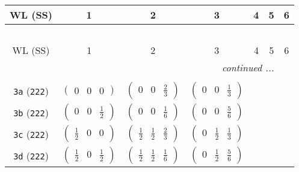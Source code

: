 \documentclass[fleqn,9pt,landscape]{jsarticle}
\begin{document}
\begin{center}
\renewcommand{\arraystretch}{1.2}
\begin{longtable}{ccccccc}
 \hline \hline
WL (SS) & 1 & 2 & 3 & 4 & 5 & 6 \\ \hline \endfirsthead

\multicolumn{6}{l}{\tablename\ \thetable{}} \\
 \hline \hline
WL (SS) & 1 & 2 & 3 & 4 & 5 & 6 \\ \hline \endhead

 \hline \hline
\multicolumn{6}{r}{\footnotesize\it continued ...} \\ \endfoot

 \hline \hline
\multicolumn{6}{r}{} \\ \endlastfoot

{\tt 3a} ({\tt 222}) & $ \begin{pmatrix} 0 & 0 & 0 \end{pmatrix} $ & $ \begin{pmatrix} 0 & 0 & \frac{2}{3} \end{pmatrix} $ & $ \begin{pmatrix} 0 & 0 & \frac{1}{3} \end{pmatrix} $ & $  $ & $  $ & $  $ \\ \hline
{\tt 3b} ({\tt 222}) & $ \begin{pmatrix} 0 & 0 & \frac{1}{2} \end{pmatrix} $ & $ \begin{pmatrix} 0 & 0 & \frac{1}{6} \end{pmatrix} $ & $ \begin{pmatrix} 0 & 0 & \frac{5}{6} \end{pmatrix} $ & $  $ & $  $ & $  $ \\ \hline
{\tt 3c} ({\tt 222}) & $ \begin{pmatrix} \frac{1}{2} & 0 & 0 \end{pmatrix} $ & $ \begin{pmatrix} \frac{1}{2} & \frac{1}{2} & \frac{2}{3} \end{pmatrix} $ & $ \begin{pmatrix} 0 & \frac{1}{2} & \frac{1}{3} \end{pmatrix} $ & $  $ & $  $ & $  $ \\ \hline
{\tt 3d} ({\tt 222}) & $ \begin{pmatrix} \frac{1}{2} & 0 & \frac{1}{2} \end{pmatrix} $ & $ \begin{pmatrix} \frac{1}{2} & \frac{1}{2} & \frac{1}{6} \end{pmatrix} $ & $ \begin{pmatrix} 0 & \frac{1}{2} & \frac{5}{6} \end{pmatrix} $ & $  $ & $  $ & $  $ \\ \hline

\end{longtable}
\end{center}
\end{document}
